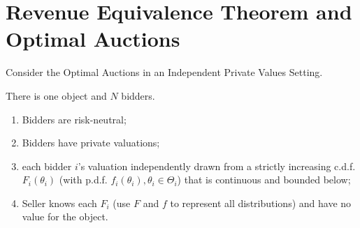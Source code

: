 \documentclass[11pt]{elegantbook}
\begin{document}
\section{Revenue Equivalence Theorem and Optimal Auctions}
Consider the Optimal Auctions in an Independent Private Values Setting.
\begin{assumption}\label{IPV:assumption}
    There is one object and $N$ bidders.
    \begin{enumerate}
        \item Bidders are risk-neutral;
        \item Bidders have private valuations;
        \item each bidder $i$'s valuation independently drawn from a strictly increasing c.d.f. $F_i(\theta_i)$ (with p.d.f. $f_i(\theta_i),\theta_i\in \Theta_i$) that is continuous and bounded below;
        \item Seller knows each $F_i$ (use $F$ and $f$ to represent all distributions) and have no value for the object.
    \end{enumerate}
\end{assumption}
\end{document}
